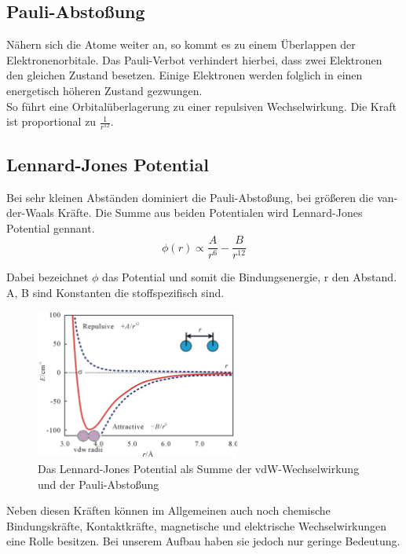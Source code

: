         \subsection{Pauli-Abstoßung}

Nähern sich die Atome weiter an, so kommt es zu einem Überlappen der 
Elektronenorbitale. Das Pauli-Verbot verhindert hierbei, dass zwei Elektronen den
gleichen Zustand besetzen. Einige Elektronen werden folglich in einen energetisch
höheren Zustand gezwungen. \\
So führt eine Orbitalüberlagerung zu einer repulsiven Wechselwirkung. Die Kraft
ist proportional zu $\displaystyle \frac{1}{r^{12}}$.

        \subsection{Lennard-Jones Potential}

Bei sehr kleinen Abständen dominiert die Pauli-Abstoßung, bei größeren die 
van-der-Waals Kräfte. Die Summe aus beiden Potentialen wird Lennard-Jones 
Potential gennant. 
\[
   \phi (r) \propto \frac{A}{r^6} - \frac{B}{r^{12}}    
\]

Dabei bezeichnet $\phi$ das Potential und somit die Bindungsenergie, r den Abstand.
A, B sind Konstanten die stoffspezifisch sind.

\begin{figure}[h!]
    \centering
    \includegraphics[width=0.6\textwidth]{Abb/ljp.jpg}
    \caption{Das Lennard-Jones Potential als Summe der vdW-Wechselwirkung und
             der Pauli-Abstoßung}
    \label{ljp}
\end{figure}

Neben diesen Kräften können im Allgemeinen auch noch chemische Bindungskräfte, Kontaktkräfte, magnetische und elektrische Wechselwirkungen eine Rolle besitzen.
Bei unserem Aufbau haben sie jedoch nur geringe Bedeutung.

 
